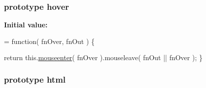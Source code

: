 \subsubsection[{hover}]{ {\bf prototype} hover}\label{jquery-1_810_82-vsdoc_8js_a89022f117a4ab5bd5f578a26a7eaafa5}
{\bfseries Initial value\+:}
\begin{DoxyCode}
= \textcolor{keyword}{function}( fnOver, fnOut ) \{


        \textcolor{keywordflow}{return} this.\hyperlink{jquery-1_810_82-vsdoc_8js_a762f67ea0a9dd89f27dbe2b23d9f91b9}{mouseenter}( fnOver ).mouseleave( fnOut || fnOver );
    \}
\end{DoxyCode}
\hypertarget{jquery-1_810_82-vsdoc_8js_a54a716632718016dd4e400e83a0970e2}{}
\subsubsection[{html}]{ {\bf prototype} html}\label{jquery-1_810_82-vsdoc_8js_a54a716632718016dd4e400e83a0970e2}
\hypertarget{jquery-1_810_82-vsdoc_8js_a8203f20935038ea9f23057d6b9bd0c35}{}
